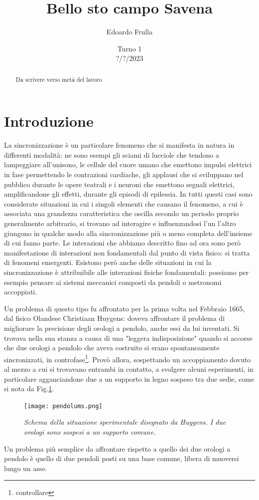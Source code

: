 \documentclass[11pt, a4paper, twoside]{article}
\author{Edoardo Frulla}
\date{Turno 1 \\ \vspace{0.3cm} ?/?/2023}
\title{Bello sto campo Savena}
\begin{document}
\maketitle
    \begin{abstract}
        Da scrivere verso metà del lavoro
    \end{abstract}

\section{Introduzione}
La sincronizzazione è un particolare fenomeno che si manifesta in natura in differenti modalità: ne sono esempi gli sciami di lucciole che tendono a lampeggiare all'unisono, le cellule del cuore umano che emettono impulsi elettrici in fase permettendo le contrazioni cardiache, gli applausi che si sviluppano nel pubblico durante le opere teatrali e i neuroni che emettono segnali elettrici, amplificandone gli effetti, durante gli episodi di epilessia.
In tutti questi casi sono considerate situazioni in cui i singoli elementi che causano il fenomeno, a cui è associata una grandezza caratteristica che oscilla secondo un periodo proprio generalmente arbitrario, si trovano ad interagire e influenzandosi l'un l'altro giungono in qualche modo alla sincronizzazione più o meno completa dell'insieme di cui fanno parte.
Le interazioni che abbiamo descritto fino ad ora sono però manifestazione di interazioni non fondamentali dal punto di vista fisico: si tratta di fenomeni emergenti. 
Esistono però anche delle situazioni in cui la sincronizzazione è attribuibile alle interazioni fisiche fondamentali: possiamo per esempio pensare ai sistemi meccanici composti da pendoli o metronomi accoppiati.

Un problema di questo tipo fu affrontato per la prima volta nel Febbraio 1665, dal fisico Olandese Christiaan Huygens: doveva affrontare il problema di migliorare la precisione degli orologi a pendolo, anche essi da lui inventati. Si trovava nella sua stanza a causa di una "leggera indisposizione" quando si accorse che due orologi a pendolo che aveva costruito si erano spontaneamente sincronizzati, in controfase\footnote{controllare}. Provò allora, sospettando un accoppiamento dovuto al mezzo a cui si trovavano entrambi in contatto, a svolgere alcuni esperimenti, in particolare agganciandone due a un supporto in legno sospeso tra due sedie, come si nota da Fig.\ref{pendoli_huygens}.
\begin{figure}
    \centering
    \texttt{[image: pendolums.png]}
    \caption{\textit{Schema della situazione sperimentale disegnato da Huygens. I due orologi sono sospesi a un supporto comune.}}
    \label{pendoli_huygens}
\end{figure}
Un problema più semplice da affrontare rispetto a quello dei due orologi a pendolo è quello di due pendoli posti su una base comune, libera di muoversi lungo un asse.
\end{document}
